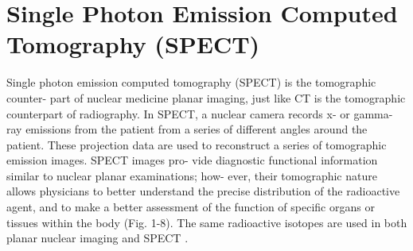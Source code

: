 \chapter{Single Photon Emission Computed Tomography (SPECT)}

Single photon emission computed tomography (SPECT) is the tomographic counter-
part of nuclear medicine planar imaging, just like CT is the tomographic counterpart
of radiography. In SPECT, a nuclear camera records x- or gamma-ray emissions from
the patient from a series of different angles around the patient. These projection data
are used to reconstruct a series of tomographic emission images. SPECT images pro-
vide diagnostic functional information similar to nuclear planar examinations; how-
ever, their tomographic nature allows physicians to better understand the precise
distribution of the radioactive agent, and to make a better assessment of the function
of specific organs or tissues within the body (Fig. 1-8). The same radioactive isotopes
are used in both planar nuclear imaging and SPECT \cite{bushberg2011essential}. 